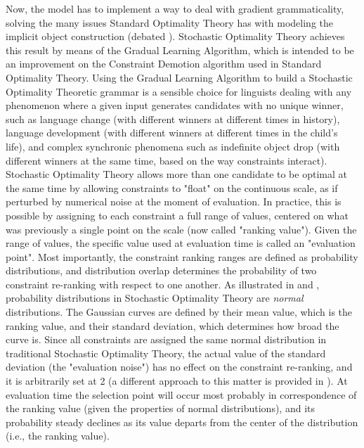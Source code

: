Now, the model has to implement a way to deal with gradient grammaticality, solving the many issues Standard Optimality Theory has with modeling the implicit object construction (debated ). Stochastic Optimality Theory achieves this result by means of the Gradual Learning Algorithm, which is intended to be an improvement on the Constraint Demotion algorithm \parencite{TesarSmolensky1993learnability} used in Standard Optimality Theory. Using the Gradual Learning Algorithm to build a Stochastic Optimality Theoretic grammar is a sensible choice for linguists dealing with any phenomenon where a given input generates candidates with no unique winner, such as language change (with different winners at different times in history), language development (with different winners at different times in the child's life), and complex synchronic phenomena such as indefinite object drop (with different winners at the same time, based on the way constraints interact).\\
Stochastic Optimality Theory allows more than one candidate to be optimal at the same time by allowing constraints to "float" on the continuous scale, as if perturbed by numerical noise at the moment of evaluation. In practice, this is possible by assigning to each constraint a full range of values, centered on what was previously a single point on the scale (now called "ranking value"). Given the range of values, the specific value used at evaluation time is called an "evaluation point". Most importantly, the constraint ranking ranges are defined as probability distributions, and distribution overlap determines the probability of two constraint re-ranking with respect to one another. As illustrated in  and , probability distributions in Stochastic Optimality Theory are \textit{normal} distributions. The Gaussian curves are defined by their mean value, which is the ranking value, and their standard deviation, which determines how broad the curve is. Since all constraints are assigned the same normal distribution in traditional Stochastic Optimality Theory, the actual value of the standard deviation (the "evaluation noise") has no effect on the constraint re-ranking, and it is arbitrarily set at 2 (a different approach to this matter is provided in \textcite{reynolds1994variation, nagy1997optimality}). At evaluation time the selection point will occur most probably in correspondence of the ranking value (given the properties of normal distributions), and its probability steady declines as its value departs from the center of the distribution (i.e., the ranking value).\\

